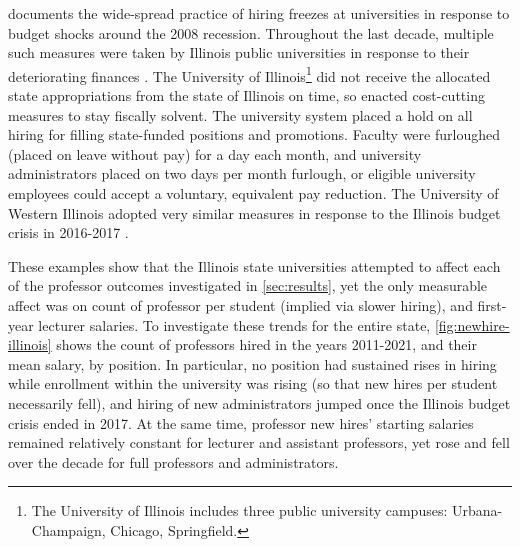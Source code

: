 \documentclass[notitlepage,12pt]{article}
\begin{document}
\cite{turner2014impact} documents the wide-spread practice of hiring freezes at universities in response to budget shocks around the 2008 recession.
Throughout the last decade, multiple such measures were taken by Illinois public universities in response to their deteriorating finances \citep{furlough2010}.
The University of Illinois\footnote{
    The University of Illinois includes three public university campuses: Urbana-Champaign, Chicago, Springfield.
} did not receive the allocated state appropriations from the state of Illinois on time, so enacted cost-cutting measures to stay fiscally solvent.
The university system placed a hold on all hiring for filling state-funded positions and promotions.
Faculty were furloughed (placed on leave without pay) for a day each month, and university administrators placed on two days per month furlough, or eligible university employees could accept a voluntary, equivalent pay reduction.
The University of Western Illinois adopted very similar measures in response to the Illinois budget crisis in 2016-2017 \citep{wiu2016}.

These examples show that the Illinois state universities attempted to affect each of the professor outcomes investigated in \autoref{sec:results}, yet the only measurable affect was on count of professor per student (implied via slower hiring), and first-year lecturer salaries.
To investigate these trends for the entire state, \autoref{fig:newhire-illinois} shows the count of professors hired in the years 2011-2021, and their mean salary, by position.
In particular, no position had sustained rises in hiring while enrollment within the university was rising (so that new hires per student necessarily fell), and hiring of new administrators jumped once the Illinois budget crisis ended in 2017.
At the same time, professor new hires' starting salaries remained relatively constant for lecturer and assistant professors, yet rose and fell over the decade for full professors and administrators.
\end{document}
